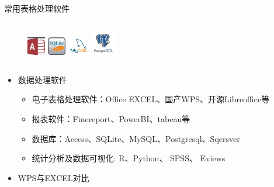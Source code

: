\begin{frame}{常用表格处理软件}
\begin{columns}
\begin{column}{\textwidth}
\begin{figure}
				\includegraphics[height=0.8cm]{figures/Access.jpeg}
				\includegraphics[height=0.8cm]{figures/SQLite.jpeg}
				\includegraphics[height=0.8cm]{figures/MySQL.png}
				\includegraphics[height=1.1cm]{figures/Postgresql.jpg}
			\end{figure}
		\end{column}
	\end{columns}
	\begin{itemize}
		\item 数据处理软件
			\begin{itemize}
				\item 电子表格处理软件：Office EXCEL、国产WPS、开源Libreoffice等
				\item 报表软件：Finereport、PowerBI、tabeau等
				\item 数据库：Access、SQLite、MySQL、Postgresql、Sqersver
				\item 统计分析及数据可视化: R、Python、 SPSS、 Eviews
			\end{itemize}
		\item WPS与EXCEL对比
		

\end{itemize}
\end{frame}
